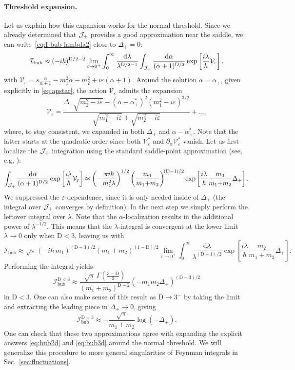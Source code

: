 \documentclass[12pt]{article}
\numberwithin{figure}{section}
\def \be {\begin{equation}}
\def \ee {\end{equation}}
\def \D {\mathrm{D}}
\def \d {\mathrm{d}}
\def \eps {\varepsilon}
\def \V {\mathcal{V}}
\def \I {\mathcal{I}}
\def \bubble {\mathrm{bub}}
\begin{document}
	\paragraph{Threshold expansion.}
	Let us explain how this expansion works for the normal threshold. Since we already determined that ${\cal J}_+$ provides a good approximation near the saddle, we can write~\eqref{eq:I-bub-lambda2} close to $\Delta_+ = 0$:
	\be
	\I_{\bubble} \approx (-i\hbar)^{\D/2-2} \lim_{\eps \to 0^+} \int_{0}^\infty \frac{\d \lambda}{\lambda^{\D/2-1}} \int_{{\cal J}_+} \frac{\d \alpha}{(\alpha + 1)^{\D/2}} \exp\left[ \frac{i\lambda}{\hbar} \V_\eps \right].
	\ee
	with $\V_{\eps} = s \frac{\alpha}{\alpha+1} - m_1^2 \alpha - m_2^2 + i \varepsilon (\alpha+1)$.
	Around the solution $\alpha = \alpha_+$, given explicitly in \eqref{eq:apstar}, the action $\V_{\eps}$ admits the expansion
	\be
	\V_\eps = \frac{\Delta_+ \sqrt{m_2^2 - i\eps} - (\alpha - \alpha_+^\ast)^2 (m_1^2 - i \eps)^{3/2}}{\sqrt{m_1^2 - i\eps} + \sqrt{m_2^2 - i\eps}} + \ldots,
	\ee
	where, to stay consistent, we expanded in both $\Delta_+$ and $\alpha-\alpha_+^\ast$. Note that the latter starts at the quadratic order since both $\V_\eps^\ast$ and $\partial_{\alpha} \V_\eps^\ast$ vanish.
	Let us first localize the ${\cal J}_+$ integration using the standard saddle-point approximation (see, e.g, \cite{doi:10.1098/rspa.1991.0119}):
	\be
	\int_{{\cal J}_+}  \frac{\d \alpha}{(\alpha + 1)^{\D/2}} \exp\left[ \frac{i\lambda}{\hbar} \V_\eps \right] \approx  \left(-\frac{\pi i \hbar
	}{m_1^2 \lambda} \right)^{1/2} \left( \frac{m_1}{m_1 {+} m_2} \right)^{\!(\D-1)/2} \exp\left[ \frac{i\lambda}{\hbar}  \frac{m_2}{m_1{+}m_2} \Delta_+ \right].
	\ee
	We suppressed the $\eps$-dependence, since
	it is only needed inside of $\Delta_+$ (the integral over ${\cal J}_+$ converges by definition).
	In the next step we simply perform the leftover integral over $\lambda$.
	Note that the $\alpha$-localization results in the additional power of $\lambda^{-1/2}$. This means that the $\lambda$-integral is convergent at the lower limit $\lambda \to 0$ only when $\D < 3$, leaving us with
	\be
	\I_\bubble \approx \sqrt{\pi} \left( -i\hbar\, m_1 \right)^{\!(\D-3)/2} (m_1 {+} m_2)^{(1-\D)/2} \lim_{\eps \to 0^+} \int_{0}^{\infty} \frac{\d\lambda}{\lambda^{(\D-1)/2}} \exp\left[ \frac{i\lambda}{\hbar} \frac{m_2}{m_1 {+} m_2} \Delta_+ \right].
	\ee
    Performing the integral yields 
    \be
	\I_\bubble^{\D < 3} \approx \frac{\sqrt{\pi}\, \Gamma(\tfrac{3-\D}{2})}{(m_1 + m_2)^{\D-2}}  \left( - m_1 m_2 \Delta_+ \right)^{(\D-3)/2}
	\ee
	in $\D<3$. One can also make sense of this result as $\D \to 3^-$ by taking the limit and extracting the leading piece in $\Delta_+ \to 0$, giving
	\be
	\I_\bubble^{\D=3} \approx -\frac{\sqrt{\pi}}{m_1 + m_2}
    \log\left( -\Delta_+\right).
	\ee
	One can check that these two approximations agree with expanding the explicit answers \eqref{eq:bub2d} and \eqref{eq:bub3d} around the normal threshold. We will generalize this procedure to more general singularities of Feynman integrals in Sec.~\ref{sec:fluctuations}. 
	
\end{document}
